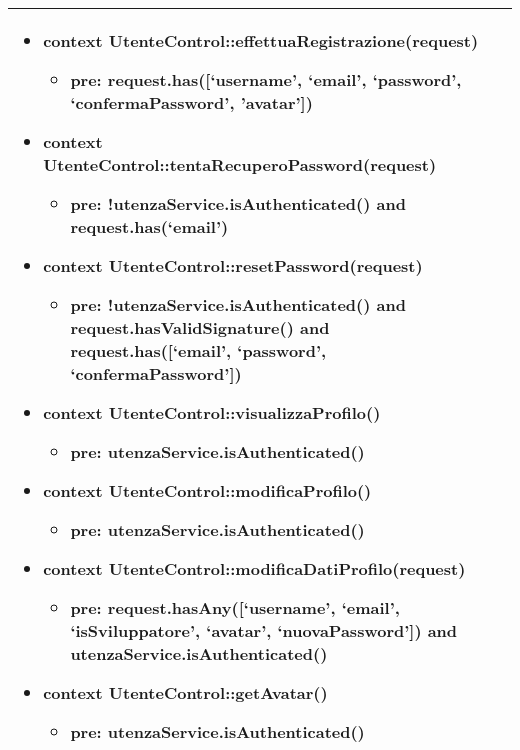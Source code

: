 \begin{tabular}{|| l | p{28em} ||}
\begin{itemize}
	    \item \textbf{context} UtenteControl::effettuaRegistrazione(request) 
		\begin{itemize}
			\item[ ] \textbf{pre:} request.has([‘username’, ‘email’, ‘password’, ‘confermaPassword’, 'avatar'])
		\end{itemize} 
	  
	    \item \textbf{context} UtenteControl::tentaRecuperoPassword(request) 
		\begin{itemize}
			\item[ ] \textbf{pre:} !utenzaService.isAuthenticated() and request.has(‘email’)
		\end{itemize} 
	  
	    \item \textbf{context} UtenteControl::resetPassword(request) 
		\begin{itemize}
			\item[ ] \textbf{pre:} !utenzaService.isAuthenticated() and request.hasValidSignature() and request.has([‘email’, ‘password’, ‘confermaPassword’])
		\end{itemize} 
	  
	    \item \textbf{context} UtenteControl::visualizzaProfilo() 
		\begin{itemize}
			\item[ ] \textbf{pre:} utenzaService.isAuthenticated()
		\end{itemize} 
	  
	    \item \textbf{context} UtenteControl::modificaProfilo() 
		\begin{itemize}
			\item[ ] \textbf{pre:} utenzaService.isAuthenticated()
		\end{itemize} 
	  
	    \item \textbf{context} UtenteControl::modificaDatiProfilo(request) 
		\begin{itemize}
			\item[ ] \textbf{pre:} request.hasAny([‘username’, ‘email’, ‘isSviluppatore’, ‘avatar’, ‘nuovaPassword’]) and utenzaService.isAuthenticated()
		\end{itemize}

		\item \textbf{context} UtenteControl::getAvatar() 
		\begin{itemize}
			\item[ ] \textbf{pre:} utenzaService.isAuthenticated()
		\end{itemize} 
	\end{itemize}\\
	\hline
\end{tabular}

